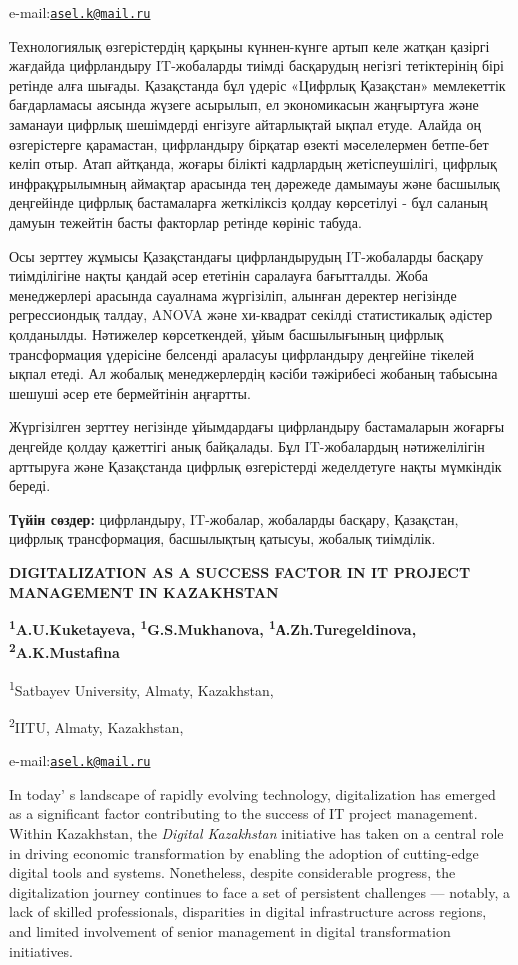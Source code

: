 e-mail:\href{mailto:asel.k@mail.ru}{\nolinkurl{asel.k@mail.ru}}

Технологиялық өзгерістердің қарқыны күннен-күнге артып келе жатқан
қазіргі жағдайда цифрландыру IT-жобаларды тиімді басқарудың негізгі
тетіктерінің бірі ретінде алға шығады. Қазақстанда бұл үдеріс «Цифрлық
Қазақстан» мемлекеттік бағдарламасы аясында жүзеге асырылып, ел
экономикасын жаңғыртуға және заманауи цифрлық шешімдерді енгізуге
айтарлықтай ықпал етуде. Алайда оң өзгерістерге қарамастан, цифрландыру
бірқатар өзекті мәселелермен бетпе-бет келіп отыр. Атап айтқанда, жоғары
білікті кадрлардың жетіспеушілігі, цифрлық инфрақұрылымның аймақтар
арасында тең дәрежеде дамымауы және басшылық деңгейінде цифрлық
бастамаларға жеткіліксіз қолдау көрсетілуі - бұл саланың дамуын тежейтін
басты факторлар ретінде көрініс табуда.

Осы зерттеу жұмысы Қазақстандағы цифрландырудың IT-жобаларды басқару
тиімділігіне нақты қандай әсер ететінін саралауға бағытталды. Жоба
менеджерлері арасында сауалнама жүргізіліп, алынған деректер негізінде
регрессиондық талдау, ANOVA және хи-квадрат секілді статистикалық
әдістер қолданылды. Нәтижелер көрсеткендей, ұйым басшылығының цифрлық
трансформация үдерісіне белсенді араласуы цифрландыру деңгейіне тікелей
ықпал етеді. Ал жобалық менеджерлердің кәсіби тәжірибесі жобаның
табысына шешуші әсер ете бермейтінін аңғартты.

Жүргізілген зерттеу негізінде ұйымдардағы цифрландыру бастамаларын
жоғарғы деңгейде қолдау қажеттігі анық байқалады. Бұл IT-жобалардың
нәтижелілігін арттыруға және Қазақстанда цифрлық өзгерістерді
жеделдетуге нақты мүмкіндік береді.

{\bfseries Түйін сөздер:} цифрландыру, IT-жобалар, жобаларды басқару,
Қазақстан, цифрлық трансформация, басшылықтың қатысуы, жобалық
тиімділік.

{\bfseries DIGITALIZATION AS A SUCCESS FACTOR IN IT PROJECT MANAGEMENT IN
KAZAKHSTAN}

{\bfseries \textsuperscript{1}A.U.Kuketayeva\textsuperscript{\envelope },
\textsuperscript{1}G.S.Mukhanova, \textsuperscript{1}А.Zh.Turegeldinova,
\textsuperscript{2}A.K.Mustafina}

\textsuperscript{1}Satbayev University, Almaty, Kazakhstan,

\textsuperscript{2}IITU, Almaty, Kazakhstan,

e-mail:\href{mailto:asel.k@mail.ru}{\nolinkurl{asel.k@mail.ru}}

In today' s landscape of rapidly evolving technology,
digitalization has emerged as a significant factor contributing to the
success of IT project management. Within Kazakhstan, the \emph{Digital
Kazakhstan} initiative has taken on a central role in driving economic
transformation by enabling the adoption of cutting-edge digital tools
and systems. Nonetheless, despite considerable progress, the
digitalization journey continues to face a set of persistent challenges
--- notably, a lack of skilled professionals, disparities in digital
infrastructure across regions, and limited involvement of senior
management in digital transformation initiatives.

